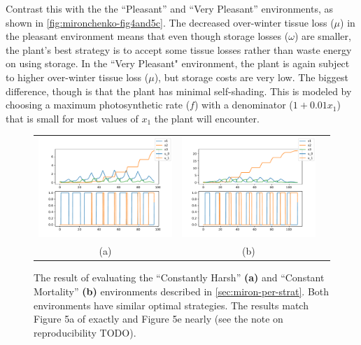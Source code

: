 \documentclass{article}
\begin{document}
Contrast this with the the ``Pleasant'' and ``Very Pleasant'' environments, as shown in \autoref{fig:mironchenko-fig4and5c}. The decreased over-winter tissue loss ($\mu$) in the pleasant environment means that even though storage losses ($\omega$) are smaller, the plant's best strategy is to accept some tissue losses rather than waste energy on using storage. In the ``Very Pleasant" environment, the plant is again subject to higher over-winter tissue loss ($\mu$), but storage costs are very low. The biggest difference, though is that the plant has minimal self-shading. This is modeled by choosing a maximum photosynthetic rate ($f$) with a denominator ($1+0.01x_1$) that is small for most values of $x_1$ the plant will encounter.



\begin{figure}
  \centering
  \begin{tabular}{ccc}
    \includegraphics[width=3in]{imgs/MironchenkoFigure5a.pdf} &
    \includegraphics[width=3in]{imgs/MironchenkoFigure5e.pdf} \\
    (a) & (b)
  \end{tabular}
  \caption{The result of evaluating the ``Constantly Harsh'' \textbf{(a)} and ``Constant Mortality'' \textbf{(b)} environments described in \autoref{sec:miron-per-strat}. Both environments have similar optimal strategies. The results match Figure 5a of \citep{mironchenko_optimal_2014} exactly and Figure 5e nearly (see the note on reproducibility TODO).\label{fig:mironchenko-fig5ae}}
\end{figure}
\end{document}
